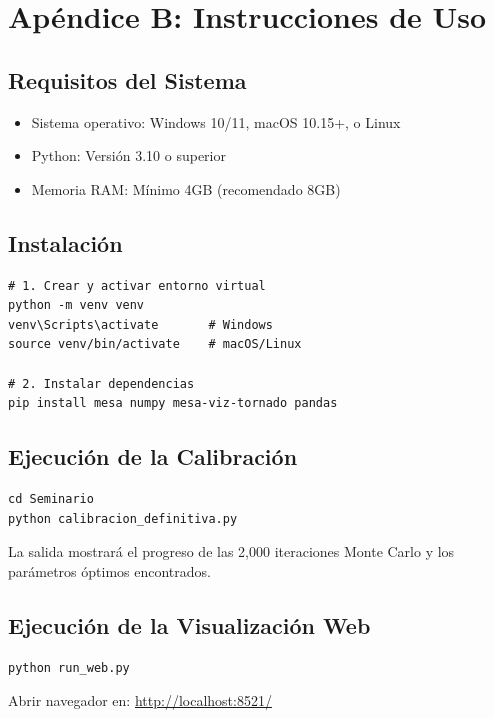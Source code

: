 \section{Apéndice B: Instrucciones de Uso}

\subsection{Requisitos del Sistema}

\begin{itemize}
    \item Sistema operativo: Windows 10/11, macOS 10.15+, o Linux
    \item Python: Versión 3.10 o superior
    \item Memoria RAM: Mínimo 4GB (recomendado 8GB)
\end{itemize}

\subsection{Instalación}

\begin{verbatim}
# 1. Crear y activar entorno virtual
python -m venv venv
venv\Scripts\activate       # Windows
source venv/bin/activate    # macOS/Linux

# 2. Instalar dependencias
pip install mesa numpy mesa-viz-tornado pandas
\end{verbatim}

\subsection{Ejecución de la Calibración}

\begin{verbatim}
cd Seminario
python calibracion_definitiva.py
\end{verbatim}

La salida mostrará el progreso de las 2,000 iteraciones Monte Carlo y los parámetros óptimos encontrados.

\subsection{Ejecución de la Visualización Web}

\begin{verbatim}
python run_web.py
\end{verbatim}

Abrir navegador en: \url{http://localhost:8521/}

